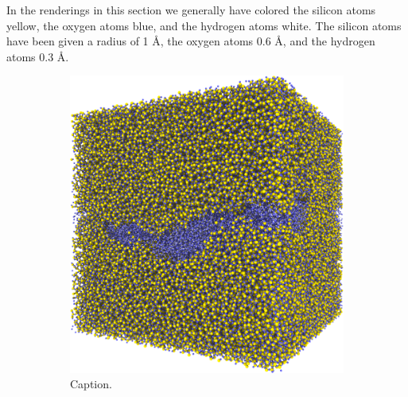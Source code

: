 In the renderings in this section we generally have colored the silicon atoms yellow, the oxygen atoms blue, and the hydrogen atoms white. The silicon atoms have been given a radius of 1 \AA, the oxygen atoms 0.6 \AA, and the hydrogen atoms 0.3 \AA.
%
\begin{figure}[htpb]%
    \centering%
    \setlength{\myfigwidth}{0.49\textwidth}%
%
    \begin{subfigure}[b]{\myfigwidth}%
        \centering%
        \includegraphics[width=\textwidth]{images/systems/trimmed-rough_fracture01_abel_13}%
        \caption{Caption.}%
    \end{subfigure}%
    \hfill%
        \begin{subfigure}[b]{\myfigwidth}%
        \centering%

\end{subfigure}
\end{figure}
